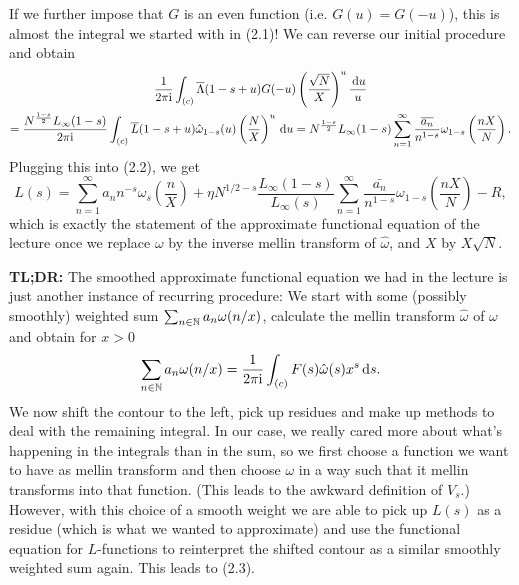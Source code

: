 \documentclass[a4paper,11pt]{article}
\begin{document}
If we further impose that $G$ is an even function (i.e. $G(u) = G(-u)$), this is
almost the integral we started with in (2.1)! We can reverse our initial procedure
and obtain
\begin{multline*}
    \frac{1}{2 \pi \mathrm i} \int_{(c)} \overline \Lambda(1-s+u) G(-u) \left( \frac {\sqrt N}X \right)^u \frac {\mathrm{\,d} u} u \\ = \frac{N^{\frac{1-s}2}L_\infty(1-s)}{2 \pi \mathrm i} \int_{(c)}
    \overline L(1-s+u) \hat \omega_{1-s}(u) \left( \frac NX \right)^u \mathrm{\,d} u
    = N^{\frac{1-s}2} L_\infty(1-s) \sum_{n=1}^\infty \frac{\overline{a_n}}{n^{1-s}}
    \omega_{1-s}\left(\frac{nX}N\right).
\end{multline*}
Plugging this into (2.2), we get 
\begin{equation}
    L(s) = \sum_{n=1}^\infty a_n n^{-s} \omega_s\left(\frac nX\right) + \eta N^{1/2 - s} \frac{L_\infty(1-s)}{L_\infty(s)} \sum_{n=1}^\infty \frac{\bar{a_n}}{n^{1-s}}
    \omega_{1-s}\left(\frac{nX}N\right) - R,
\end{equation}
which is exactly the statement of the approximate functional equation of the lecture
once we replace $\omega$ by the inverse mellin transform of $\hat \omega$, 
and $X$ by $X\sqrt N$. 

\textbf{TL;DR:} The smoothed approximate functional equation we had in the lecture
is just another instance of recurring procedure: 
We start with some (possibly smoothly) weighted sum $\sum_{n \in \mathbb{N}} a_n
\omega(n/x)$, calculate the mellin transform $\hat \omega$ of $\omega$ and obtain
for $x > 0$ 
$$ \sum_{n \in \mathbb{N}} a_n \omega(n/x) =\frac{1}{2 \pi \mathrm i} \int_{(c)} F(s) \hat \omega(s) x^s
\mathrm{\,d} s. $$
We now shift the contour to the left, pick up residues and make up methods to
deal with the remaining integral. In our case, we really cared more about what's 
happening in the integrals than in the sum, so we first choose a function we want to
have as mellin transform and then choose $\omega$ in a way such that it mellin
transforms into that function. (This leads to the awkward definition of $V_s$.)
However, with this choice of a smooth weight we are able to pick up $L(s)$ as 
a residue (which is what we wanted to approximate) and use the 
functional equation for $L$-functions to reinterpret the shifted contour as 
a similar smoothly weighted sum again. This leads to (2.3).



\end{document}
